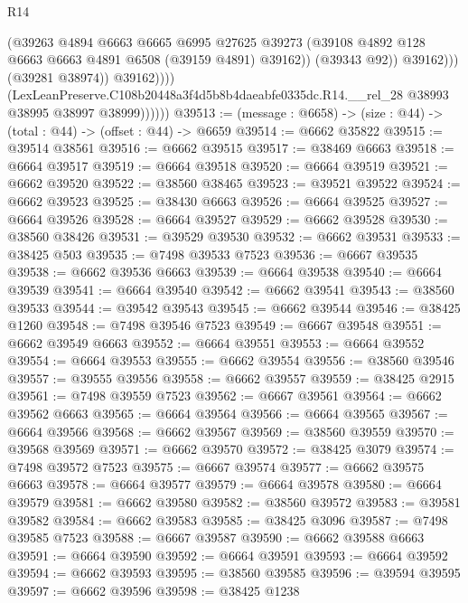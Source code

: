 \begin{lexlean}{R14}
\begin{coremodule}
                                (@39263
                                  @4894
                                  @6663
                                  @6665
                                  @6995
                                  @27625
                                  @39273
                                  (@39108 @4892 @128 @6663 @6663 @4891 @6508 (@39159 @4891) @39162))
                                (@39343 @92))
                              @39162)))
                        (@39281 @38974))
                      @39162))))
              (LexLeanPreserve.C108b20448a3f4d5b8b4daeabfe0335dc.R14.__rel_28
                @38993
                @38995
                @38997
                @38999))))))
@39513 := (message : @6658) -> (size : @44) -> (total : @44) -> (offset : @44) -> @6659
@39514 := @6662 @35822
@39515 := @39514 @38561
@39516 := @6662 @39515
@39517 := @38469 @6663
@39518 := @6664 @39517
@39519 := @6664 @39518
@39520 := @6664 @39519
@39521 := @6662 @39520
@39522 := @38560 @38465
@39523 := @39521 @39522
@39524 := @6662 @39523
@39525 := @38430 @6663
@39526 := @6664 @39525
@39527 := @6664 @39526
@39528 := @6664 @39527
@39529 := @6662 @39528
@39530 := @38560 @38426
@39531 := @39529 @39530
@39532 := @6662 @39531
@39533 := @38425 @503
@39535 := @7498 @39533 @7523
@39536 := @6667 @39535
@39538 := @6662 @39536 @6663
@39539 := @6664 @39538
@39540 := @6664 @39539
@39541 := @6664 @39540
@39542 := @6662 @39541
@39543 := @38560 @39533
@39544 := @39542 @39543
@39545 := @6662 @39544
@39546 := @38425 @1260
@39548 := @7498 @39546 @7523
@39549 := @6667 @39548
@39551 := @6662 @39549 @6663
@39552 := @6664 @39551
@39553 := @6664 @39552
@39554 := @6664 @39553
@39555 := @6662 @39554
@39556 := @38560 @39546
@39557 := @39555 @39556
@39558 := @6662 @39557
@39559 := @38425 @2915
@39561 := @7498 @39559 @7523
@39562 := @6667 @39561
@39564 := @6662 @39562 @6663
@39565 := @6664 @39564
@39566 := @6664 @39565
@39567 := @6664 @39566
@39568 := @6662 @39567
@39569 := @38560 @39559
@39570 := @39568 @39569
@39571 := @6662 @39570
@39572 := @38425 @3079
@39574 := @7498 @39572 @7523
@39575 := @6667 @39574
@39577 := @6662 @39575 @6663
@39578 := @6664 @39577
@39579 := @6664 @39578
@39580 := @6664 @39579
@39581 := @6662 @39580
@39582 := @38560 @39572
@39583 := @39581 @39582
@39584 := @6662 @39583
@39585 := @38425 @3096
@39587 := @7498 @39585 @7523
@39588 := @6667 @39587
@39590 := @6662 @39588 @6663
@39591 := @6664 @39590
@39592 := @6664 @39591
@39593 := @6664 @39592
@39594 := @6662 @39593
@39595 := @38560 @39585
@39596 := @39594 @39595
@39597 := @6662 @39596
@39598 := @38425 @1238

\end{coremodule}
\end{lexlean}
